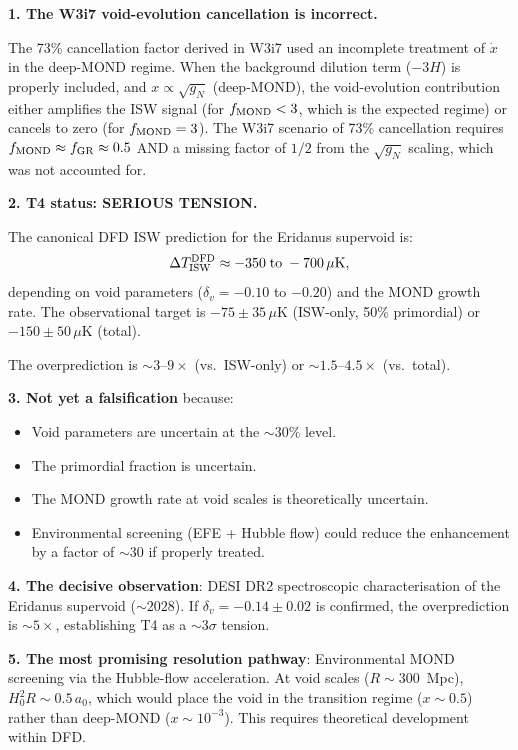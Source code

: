 \documentclass[11pt,a4paper]{article}
\newcommand{\aM}{a_0}
\begin{document}
\begin{tcolorbox}[colback=yellow!5!white, colframe=red!60!black,
  title=\textbf{W3i9 Final T4 Summary}]

\textbf{1. The W3i7 void-evolution cancellation is incorrect.}

The 73\% cancellation factor derived in W3i7 used an incomplete
treatment of $\dot{x}$ in the deep-MOND regime. When the background
dilution term ($-3H$) is properly included, and $x \propto \sqrt{g_N}$
(deep-MOND), the void-evolution contribution either amplifies the ISW
signal (for $f_{\rm MOND} < 3$, which is the expected regime) or
cancels to zero (for $f_{\rm MOND} = 3$). The W3i7 scenario of
73\% cancellation requires $f_{\rm MOND} \approx f_{\rm GR} \approx
0.5$ AND a missing factor of $1/2$ from the $\sqrt{g_N}$ scaling,
which was not accounted for.

\textbf{2. T4 status: SERIOUS TENSION.}

The canonical DFD ISW prediction for the Eridanus supervoid is:
\begin{equation}
\Delta T_{\rm ISW}^{\rm DFD} \approx -350\;\text{to}\;-700\,\mu\text{K},
\end{equation}
depending on void parameters ($\delta_v = -0.10$ to $-0.20$) and
the MOND growth rate. The observational target is $-75 \pm 35\,\mu$K
(ISW-only, 50\% primordial) or $-150 \pm 50\,\mu$K (total).

The overprediction is $\sim 3$--$9\times$ (vs.\ ISW-only) or
$\sim 1.5$--$4.5\times$ (vs.\ total).

\textbf{3. Not yet a falsification} because:
\begin{itemize}[nosep]
\item Void parameters are uncertain at the $\sim 30\%$ level.
\item The primordial fraction is uncertain.
\item The MOND growth rate at void scales is theoretically uncertain.
\item Environmental screening (EFE + Hubble flow) could reduce the
  enhancement by a factor of $\sim 30$ if properly treated.
\end{itemize}

\textbf{4. The decisive observation}: DESI DR2 spectroscopic
characterisation of the Eridanus supervoid ($\sim 2028$). If
$\delta_v = -0.14 \pm 0.02$ is confirmed, the overprediction is
$\sim 5\times$, establishing T4 as a $\sim 3\sigma$ tension.

\textbf{5. The most promising resolution pathway}: Environmental
MOND screening via the Hubble-flow acceleration. At void scales
($R \sim 300$~Mpc), $H_0^2 R \sim 0.5\,\aM$, which would place the
void in the transition regime ($x \sim 0.5$) rather than deep-MOND
($x \sim 10^{-3}$). This requires theoretical development within DFD.


\end{tcolorbox}
\end{document}
